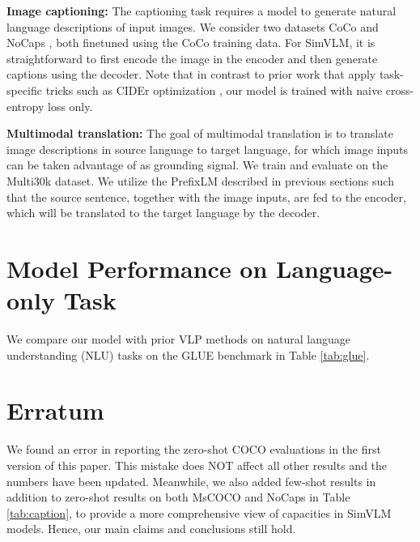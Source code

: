\documentclass{article} \usepackage{iclr2022_conference,times}
\newcommand{\ours}{SimVLM}
\begin{document}
\textbf{Image captioning:}
The captioning task requires a model to generate natural language descriptions of input images. We consider two datasets CoCo \citep{chen2015microsoft} and NoCaps \citep{agrawal2019nocaps}, both finetuned using the CoCo training data.
For {\ours}, it is straightforward to first encode the image in the encoder and then generate captions using the decoder. Note that in contrast to prior work that apply task-specific tricks such as CIDEr optimization \citep{rennie2017self}, our model is trained with naive cross-entropy loss only.

\textbf{Multimodal translation:}
The goal of multimodal translation is to translate image descriptions in source language to target language, for which image inputs can be taken advantage of as grounding signal. We train and evaluate on the Multi30k \citep{elliott2016multi30k} dataset. We utilize the PrefixLM described in previous sections such that the source sentence, together with the image inputs, are fed to the encoder, which will be translated to the target language by the decoder.


\section{Model Performance on Language-only Task}
\label{appexdix:language}
We compare our model with prior VLP methods on natural language understanding (NLU) tasks on the GLUE benchmark \citep{wang2018glue} in Table \ref{tab:glue}.


\section{Erratum}
\label{appexdix:erratum}
We found an error in reporting the zero-shot COCO evaluations in the first version of this paper. 
This mistake does NOT affect all other results and the numbers have been updated.
Meanwhile, we also added few-shot results in addition to zero-shot results on both MsCOCO and NoCaps in Table \ref{tab:caption}, to provide a more comprehensive view of capacities in SimVLM models.
Hence, our main claims and conclusions still hold.
\end{document}
